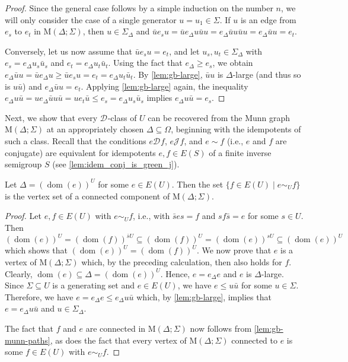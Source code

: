 \documentclass[anonymous,letter,UKenglish,cleveref,autoref,thm-restate]{lipics-v2021}
\renewcommand{\geq}{\geqslant}
\renewcommand{\leq}{\leqslant}
\newcommand{\sse}{\subseteq}
\newcommand{\dom}{\operatorname{dom}}
\newcommand*{\gD}[1][]{\mathrel{\mathcal{D}_{#1}}}
\newcommand*{\gJ}[1][]{\mathrel{\mathcal{J}_{#1}}}
\theoremstyle{plain}
\theoremstyle{plain}
\begin{document}
\begin{proof}
  Since the general case follows by a simple induction on the number $n$, we will only consider the case of a single generator $u = u_1 \in \Sigma$.
  If $u$ is an edge from $e_s$ to $e_t$ in $\mathrm{M}(\Delta; \Sigma)$, then $u \in \Sigma_\Delta$ and $\bar u e_s u = \bar u e_\Delta u\bar u u = e_\Delta \bar u u \bar u u = e_\Delta \bar u u = e_t$.
  
  Conversely, let us now assume that $\bar u e_s u = e_t$, and let $u_s, u_t \in \Sigma_\Delta$ with $e_s = e_\Delta u_s \bar u_s$ and $e_t = e_\Delta u_t \bar u_t$.
  Using the fact that $e_\Delta \geq e_s$, we obtain $e_\Delta \bar u u = \bar u e_\Delta u \geq \bar u e_s u = e_t = e_\Delta u_t \bar u_t$.
  By \cref{lem:gb-large}, $\bar u u$ is $\Delta$-large (and thus so is $u\bar u$) and $e_\Delta \bar u u = e_t$.
  Applying \cref{lem:gb-large} again, the inequality $e_\Delta u \bar u = ue_\Delta \bar u u \bar u = u e_t \bar u \leq e_s = e_\Delta u_s\bar u_s$ implies $e_\Delta u\bar u = e_s$.
\end{proof}

Next, we show that every $\gD$-class of $U$ can be recovered from the Munn graph $\mathrm{M}(\Delta; \Sigma)$ at an appropriately chosen $\Delta \sse \Omega$, beginning with the idempotents of such a class.
Recall that the conditions $e \gD f$, $e \gJ f$, and $e \sim f$ (i.e., $e$ and $f$ are conjugate) are equivalent for idempotents $e,f \in E(S)$ of a finite inverse semigroup $S$ (see \cref{lem:idem_conj_is_green_j}).


\begin{lemma}\label{lem:gb-munn-vertices}
  Let $\Delta = (\dom(e))^U$ for some $e \in E(U)$.
  Then the set $\{f \in E(U) \mid e \sim_U f\}$ is the vertex set of a connected component of $\mathrm{M}(\Delta; \Sigma)$.
\end{lemma}

\begin{proof}
  Let $e,f \in E(U)$ with $e \sim_U f$, i.e., with $\bar s e s = f$ and $s f \bar s = e$ for some $s \in U$.
  Then
  \[
    (\dom(e))^U = (\dom(f))^{\bar s U} \sse (\dom(f))^U = (\dom(e))^{s U} \sse (\dom(e))^U
  \]
  which shows that $(\dom(e))^U = (\dom(f))^U$.
  We now prove that $e$ is a vertex of $\mathrm{M}(\Delta; \Sigma)$ which, by the preceding calculation, then also holds for $f$.
  Clearly, $\dom(e) \sse \Delta = (\dom(e))^U$.
  Hence, $e = e_\Delta e$ and $e$ is $\Delta$-large.
  Since $\Sigma \sse U$ is a generating set and $e\in E(U)$, we have $e \leq u\bar u$ for some $u \in \Sigma$.
  Therefore, we have $e = e_\Delta e \leq e_\Delta u\bar u$ which, by \cref{lem:gb-large}, implies that $e = e_\Delta u\bar u$ and $u \in \Sigma_\Delta$.

  The fact that $f$ and $e$ are connected in $\mathrm{M}(\Delta; \Sigma)$ now follows from \cref{lem:gb-munn-paths}, as does the fact that every vertex of $\mathrm{M}(\Delta; \Sigma)$ connected to $e$ is some $f \in E(U)$ with $e \sim_U f$.
\end{proof}
\end{document}
